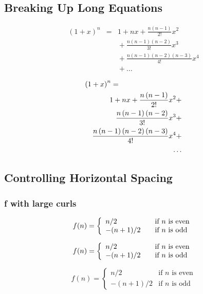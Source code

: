 \documentclass{article}
\begin{document}
\subsection{Breaking Up Long Equations}
\begin{eqnarray*}
\left(1+x\right)^n & = & 1 + nx + \frac{n\left(n-1\right)}{2!}x^2 \\
& & {} + \frac{n\left(n-1\right)\left(n-2\right)}{3!}x^3 \\
& & {} + \frac{n\left(n-1\right)\left(n-2\right)\left(n-3\right)}{4!}x^4 \\
& & {} + \ldots
\end{eqnarray*}
\vspace{10pt}

\begin{eqnarray*}
\lefteqn{\left(1+x\right)^n = } \\
& & 1 + nx + \frac{n\left(n-1\right)}{2!}x^2 + \\
& & \frac{n\left(n-1\right)\left(n-2\right)}{3!}x^3 + \\
& & \frac{n\left(n-1\right)\left(n-2\right)\left(n-3\right)}{4!}x^4 + \\
& & \ldots
\end{eqnarray*}
\vspace{10pt}

\subsection{Controlling Horizontal Spacing}
\subsubsection{f with large curls} 

\[f(n) = \left\{
\begin{array}{l l}
n/2 & \quad \mbox{if $n$ is even}\\ -(n+1)/2 & \quad \mbox{if $n$ is odd}\\ \end{array} \right. \]

\[
f(n) = \left\{
\begin{array}{l l}
n/2 & \quad \mbox{if $n$ is even}\\ -(n+1)/2 & \quad \mbox{if $n$ is odd}\\ \end{array} \right. 
\]
\vspace{10pt}

\[f(n) =
\begin{cases}
n/2 & \text{if $n$ is even} \\
-(n+1)/2 & \text{if $n$ is odd}
\end{cases}
\]
\vspace{10pt}
\end{document}
